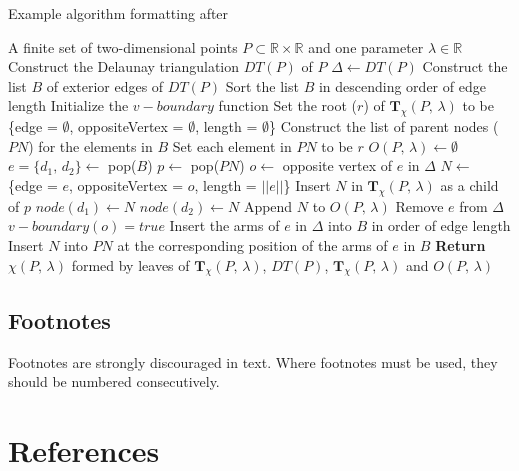 \documentclass{josis}
\begin{document}
\begin{algorithm}[htb]
\caption{Example algorithm formatting after \cite{zhong16.IJGIS}} \label{alg:1}
\footnotesize
\begin{algorithmic} [1]                   %
\Require A finite set of two-dimensional points $P \subset \mathbb{R} \times \mathbb{R}$ and one parameter $\lambda \in \mathbb{R}$
\State Construct the Delaunay triangulation $DT(P)$ of $P$
\State $\Delta \gets DT(P)$
\State Construct the list $B$ of exterior edges of $DT(P)$
\State Sort the list $B$ in descending order of edge length
\State Initialize the $v\!-\!boundary$ function
\State Set the root ($r$) of $\mathbf{T}_{{\chi}}(P,\, \lambda)$ to be \{edge = $\emptyset$, oppositeVertex = $\emptyset$, length = $\emptyset$\} 
\State Construct the list of parent nodes ($PN$) for the elements in $B$
\State Set each element in $PN$ to be $r$
\State $O(P,\, \lambda) \gets \emptyset$
    \State $e = \{d_1,\, d_2\} \gets$ pop($B$)
    \State $p \gets$ pop($PN$)
    \State $o \gets$ opposite vertex of $e$ in $\Delta$
    \State $N \gets$ \{edge = $e$, oppositeVertex = $o$, length = $||e||$\}
    \State Insert $N$ in $\mathbf{T}_{{\chi}}(P,\, \lambda)$ as a child of $p$
    \State $node(d_1) \gets N$
    \State $node(d_2) \gets N$
    \State Append $N$ to $O(P,\, \lambda)$
        \State Remove $e$ from $\Delta$
        \State $v\!-\!boundary(o) = true$
        \State Insert the arms of $e$ in $\Delta$ into $B$ in order of edge length
        \State Insert $N$ into $PN$ at the corresponding position of the arms of $e$ in $B$ 
    \EndIf
\EndWhile
\State \textbf{Return} $\chi(P,\, \lambda)$ formed by leaves of $\mathbf{T}_{{\chi}}(P,\, \lambda)$, $DT(P)$, $\mathbf{T}_{{\chi}}(P,\, \lambda)$ and $O(P,\, \lambda)$
\end{algorithmic}
\end{algorithm}

\subsection{Footnotes}

Footnotes are strongly discouraged in text. Where footnotes must be
used, they should be numbered consecutively.

\hypertarget{references}{%
\section{References}\label{references}}
\end{document}
